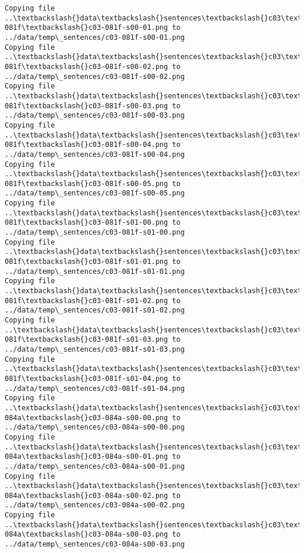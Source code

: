 \documentclass[11pt]{article}
\begin{document}
\begin{Verbatim}[commandchars=\\\{\}]
Copying file ..\textbackslash{}data\textbackslash{}sentences\textbackslash{}c03\textbackslash{}c03-081f\textbackslash{}c03-081f-s00-01.png to
../data/temp\_sentences/c03-081f-s00-01.png
Copying file ..\textbackslash{}data\textbackslash{}sentences\textbackslash{}c03\textbackslash{}c03-081f\textbackslash{}c03-081f-s00-02.png to
../data/temp\_sentences/c03-081f-s00-02.png
Copying file ..\textbackslash{}data\textbackslash{}sentences\textbackslash{}c03\textbackslash{}c03-081f\textbackslash{}c03-081f-s00-03.png to
../data/temp\_sentences/c03-081f-s00-03.png
Copying file ..\textbackslash{}data\textbackslash{}sentences\textbackslash{}c03\textbackslash{}c03-081f\textbackslash{}c03-081f-s00-04.png to
../data/temp\_sentences/c03-081f-s00-04.png
Copying file ..\textbackslash{}data\textbackslash{}sentences\textbackslash{}c03\textbackslash{}c03-081f\textbackslash{}c03-081f-s00-05.png to
../data/temp\_sentences/c03-081f-s00-05.png
Copying file ..\textbackslash{}data\textbackslash{}sentences\textbackslash{}c03\textbackslash{}c03-081f\textbackslash{}c03-081f-s01-00.png to
../data/temp\_sentences/c03-081f-s01-00.png
Copying file ..\textbackslash{}data\textbackslash{}sentences\textbackslash{}c03\textbackslash{}c03-081f\textbackslash{}c03-081f-s01-01.png to
../data/temp\_sentences/c03-081f-s01-01.png
Copying file ..\textbackslash{}data\textbackslash{}sentences\textbackslash{}c03\textbackslash{}c03-081f\textbackslash{}c03-081f-s01-02.png to
../data/temp\_sentences/c03-081f-s01-02.png
Copying file ..\textbackslash{}data\textbackslash{}sentences\textbackslash{}c03\textbackslash{}c03-081f\textbackslash{}c03-081f-s01-03.png to
../data/temp\_sentences/c03-081f-s01-03.png
Copying file ..\textbackslash{}data\textbackslash{}sentences\textbackslash{}c03\textbackslash{}c03-081f\textbackslash{}c03-081f-s01-04.png to
../data/temp\_sentences/c03-081f-s01-04.png
Copying file ..\textbackslash{}data\textbackslash{}sentences\textbackslash{}c03\textbackslash{}c03-084a\textbackslash{}c03-084a-s00-00.png to
../data/temp\_sentences/c03-084a-s00-00.png
Copying file ..\textbackslash{}data\textbackslash{}sentences\textbackslash{}c03\textbackslash{}c03-084a\textbackslash{}c03-084a-s00-01.png to
../data/temp\_sentences/c03-084a-s00-01.png
Copying file ..\textbackslash{}data\textbackslash{}sentences\textbackslash{}c03\textbackslash{}c03-084a\textbackslash{}c03-084a-s00-02.png to
../data/temp\_sentences/c03-084a-s00-02.png
Copying file ..\textbackslash{}data\textbackslash{}sentences\textbackslash{}c03\textbackslash{}c03-084a\textbackslash{}c03-084a-s00-03.png to
../data/temp\_sentences/c03-084a-s00-03.png

\end{Verbatim}
\end{document}

